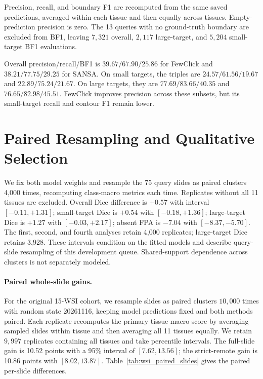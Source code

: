 
Precision, recall, and boundary F1 are recomputed from the same saved predictions, averaged within each tissue and then equally across tissues. Empty-prediction precision is zero. The 13 queries with no ground-truth boundary are excluded from BF1, leaving $7{,}321$ overall, $2{,}117$ large-target, and $5{,}204$ small-target BF1 evaluations.

Overall precision/recall/BF1 is $39.67/67.90/25.86$ for FewClick and $38.21/77.75/29.25$ for SANSA. On small targets, the triples are $24.57/61.56/19.67$ and $22.89/75.24/21.67$. On large targets, they are $77.69/83.66/40.35$ and $76.65/82.98/45.51$. FewClick improves precision across these subsets, but its small-target recall and contour F1 remain lower.

\section{Paired Resampling and Qualitative Selection}

We fix both model weights and resample the 75 query slides as paired clusters 4,000 times, recomputing class-macro metrics each time. Replicates without all 11 tissues are excluded. Overall Dice difference is $+0.57$ with interval $[-0.11,+1.31]$; small-target Dice is $+0.54$ with $[-0.18,+1.36]$; large-target Dice is $+1.27$ with $[-0.03,+2.17]$; absent FPA is $-7.04$ with $[-8.37,-5.70]$. The first, second, and fourth analyses retain 4,000 replicates; large-target Dice retains 3,928. These intervals condition on the fitted models and describe query-slide resampling of this development queue. Shared-support dependence across clusters is not separately modeled.

\paragraph{Paired whole-slide gains.}

For the original 15-WSI cohort, we resample slides as paired clusters $10{,}000$ times with random state 20261116, keeping model predictions fixed and both methods paired. Each replicate recomputes the primary tissue-macro score by averaging sampled slides within tissue and then averaging all 11 tissues equally. We retain $9{,}997$ replicates containing all tissues and take percentile intervals. The full-slide gain is 10.52 points with a 95\% interval of $[7.62,13.56]$; the strict-remote gain is 10.86 points with $[8.02,13.87]$. Table~\ref{tab:wsi_paired_slides} gives the paired per-slide differences.

